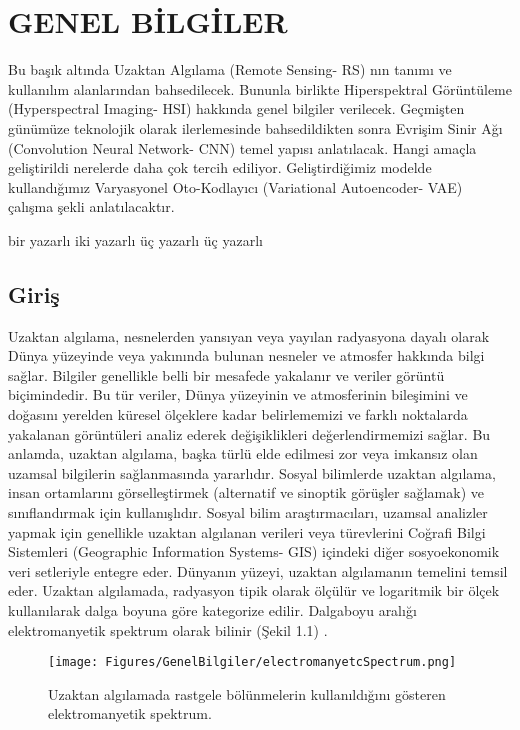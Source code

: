 \chapter{GENEL BİLGİLER}
\thispagestyle{empty}
Bu başık altında  Uzaktan Algılama (Remote Sensing- RS) nın tanımı ve kullanılım alanlarından bahsedilecek. Bununla birlikte Hiperspektral Görüntüleme (Hyperspectral Imaging- HSI) hakkında genel bilgiler verilecek. Geçmişten günümüze teknolojik olarak ilerlemesinde bahsedildikten sonra Evrişim Sinir Ağı (Convolution Neural Network- CNN) temel yapısı anlatılacak. Hangi amaçla geliştirildi nerelerde daha çok tercih ediliyor. Geliştirdiğimiz modelde kullandığımız Varyasyonel Oto-Kodlayıcı (Variational Autoencoder- VAE) çalışma şekli anlatılacaktır.


\citep{eismann2012hyperspectral} bir yazarlı 
\citep{lu2014medical} iki yazarlı
\citep*{lowe2017hyperspectral} üç yazarlı
\citep{lowe2017hyperspectral} üç yazarlı

\section{Giriş}
Uzaktan algılama, nesnelerden yansıyan veya yayılan radyasyona dayalı olarak Dünya yüzeyinde veya yakınında bulunan nesneler ve atmosfer hakkında bilgi sağlar. Bilgiler genellikle belli bir mesafede yakalanır ve veriler görüntü biçimindedir.
Bu tür veriler, Dünya yüzeyinin ve atmosferinin bileşimini ve doğasını yerelden küresel ölçeklere kadar belirlememizi ve farklı noktalarda yakalanan görüntüleri analiz ederek değişiklikleri değerlendirmemizi sağlar.
Bu anlamda, uzaktan algılama, başka türlü elde edilmesi zor veya imkansız olan uzamsal bilgilerin sağlanmasında yararlıdır. Sosyal bilimlerde uzaktan algılama, insan ortamlarını görselleştirmek (alternatif ve sinoptik görüşler sağlamak) ve sınıflandırmak için kullanışlıdır. Sosyal bilim araştırmacıları, uzamsal analizler yapmak için genellikle uzaktan algılanan verileri veya türevlerini Coğrafi Bilgi Sistemleri (Geographic Information Systems- GIS) içindeki diğer sosyoekonomik veri setleriyle entegre eder. Dünyanın yüzeyi, uzaktan algılamanın temelini temsil eder. Uzaktan algılamada, radyasyon tipik olarak ölçülür ve logaritmik bir ölçek kullanılarak dalga boyuna göre kategorize edilir. Dalgaboyu aralığı elektromanyetik spektrum olarak bilinir (Şekil 1.1) \cite{READ2009335}.

\begin{figure}[!ht]
  \centering
  \texttt{[image: Figures/GenelBilgiler/electromanyetcSpectrum.png]}
  \caption{Uzaktan algılamada rastgele bölünmelerin kullanıldığını gösteren elektromanyetik spektrum. }
\end{figure}

